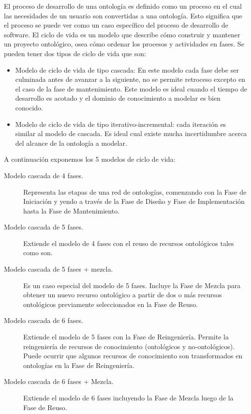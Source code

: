 El proceso de desarrollo de una ontología es definido como un proceso en el cual las necesidades de un usuario son convertidas a una ontología. Esto significa que el proceso se puede ver como un caso específico del proceso de desarrollo de software.	
El ciclo de vida es un modelo que describe cómo construir y mantener un proyecto ontológico, osea cómo ordenar los procesos y actividades en fases. Se pueden tener dos tipos de ciclo de vida que son:

\begin{itemize}
    \item Modelo de ciclo de vida de tipo cascada: En este modelo cada fase debe ser culminada antes de avanzar a la siguiente, no se permite retroceso excepto en el caso de la fase de mantenimiento. Este modelo es ideal cuando el tiempo de desarrollo es acotado y el dominio de conocimiento a modelar es bien conocido.
    \item Modelo de ciclo de vida de tipo iterativo-incremental: cada iteración es similar al modelo de cascada. Es ideal cual existe mucha incertidumbre acerca del alcance de la ontología a modelar.
\end{itemize}

A continuación exponemos los 5 modelos de ciclo de vida:	

\begin{description}
    \item[Modelo cascada de 4 fases.] Representa las etapas de una red de ontologías, comenzando con la Fase de Iniciación y yendo a través de la Fase de Diseño y Fase de Implementación hasta la Fase de Mantenimiento.
    \item[Modelo cascada de 5 fases.] Extiende el modelo de 4 fases con el reuso de recursos  ontológicos tales como son.
    \item[Modelo cascada de 5 fases + mezcla.] Es un caso especial del modelo de 5 fases. Incluye la Fase de Mezcla para obtener un nuevo recurso ontológico a partir de dos o más recursos ontológicos previamente seleccionados en la Fase de Reuso.
    \item[Modelo cascada de 6 fases.] Extiende el modelo de 5 fases con la Fase de Reingeniería. Permite la reingeniería de recursos de conocimiento (ontológicos y no-ontológicos). Puede ocurrir que algunos recursos de conocimiento son transformados en ontologías en la Fase de Reingeniería.
    \item[Modelo cascada de 6 fases + Mezcla.] Extiende el modelo de 6 fases incluyendo la Fase de Mezcla luego de la Fase de Reuso.
\end{description}

